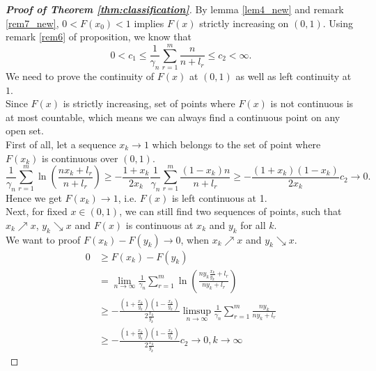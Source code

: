 \documentclass[12pt]{article}
\theoremstyle{plain}
\theoremstyle{definition}
\theoremstyle{remark}
\begin{document}
\begin{proof}[\textit{\textbf{Proof of Theorem \ref{thm:classification}}}]
    By lemma \ref{lem4_new} and remark \ref{rem7_new}, $0<F(x_0)<1$ implies $F(x)$ strictly increasing on $(0,1)$. Using remark \ref{rem6} of proposition, we know that
    \begin{equation*}
    0<c_1\leq \frac{1}{\gamma_{n}} \sum_{r=1}^{m} \frac{n}{n+l_{r}} %
    \leq c_2<\infty.
    \end{equation*}
     We need to prove the continuity of $F(x)$ at $(0,1)$ as well as left continuity at $1$.\\
     Since $F(x)$ is strictly increasing, set of points where $F(x)$ is not continuous is at most countable, which means we can always find a continuous point on any open set.\\
First of all, let a sequence $x_k\to 1$ which belongs to the set of point where $F(x_k)$ is continuous over $(0,1)$.
\begin{equation*}
 \frac{1}{\gamma_{n}} \sum_{r=1}^{m} \ln \left(\frac{n x_k+l_{r}}{n+l_{r}}\right)\geq -\frac{1+x_k}{2 x_k} \frac{1}{\gamma_{n}} \sum_{r=1}^{m} \frac{(1-x_k) n}{n+l_{r}} \geq -\frac{(1+x_k)(1-x_k)}{2x_k}c_2\to 0.
\end{equation*}
Hence we get $F(x_k)\to 1$, i.e. $F(x)$ is left continuous at 1.\\
Next, for fixed $x\in (0,1)$, we can still find two sequences of points, such that $x_k\nearrow x$, $y_k\searrow x$ and $F(x)$ is continuous at $x_k$ and $y_k$ for all $k$.\\
We want to proof $F(x_k)-F(y_k)\to 0$, when $x_k\nearrow x$ and $y_k\searrow x$.
\begin{align*}
    0&\geq F(x_k)-F(y_k)\\
  &= \lim _{n \rightarrow \infty} \frac{1}{\gamma_{n}} \sum_{r=1}^{m} \ln \left(\frac{n y_{k} \frac{x_{k}}{y_{k}}+l_{r}}{n y_{k}+l_{r}}\right)\\
  &\geq   -\frac{(1+\frac{x_{k}}{y_{k}})(1-\frac{x_{k}}{y_{k}})}{2 \frac{x_{k}}{y_{k}}} \limsup _{n \rightarrow \infty} \frac{1}{\gamma_{n}} \sum_{r=1}^{m} \frac{ ny_k}{ny_k+l_{r}}\\ &\geq-\frac{\left(1+\frac{x_{k}}{y_{k}}\right)\left(1-\frac{x_{k}}{y_{k}}\right)}{2 \frac{x_{k}}{y_{k}}} c_2\to 0, k\to  \infty
\end{align*}


\end{proof}
\end{document}
